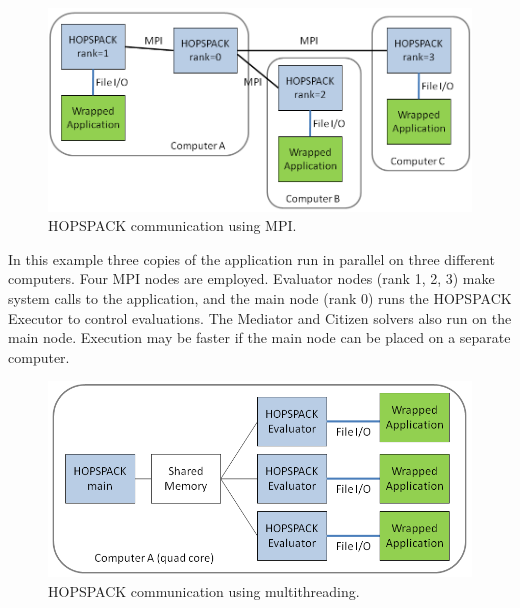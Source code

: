\clearpage
\begin{figure}[!h]
  \begin{center}
    \includegraphics[width=5.0in]{EvalWithMpiClipped.png}
  \end{center}
  \vspace{-5mm}
  \caption{HOPSPACK communication using MPI.}
  \label{fig:evalMPI}
\end{figure}

\vspace{-11pt}
\noindent
In this example three copies of the application run in parallel
on three different computers.  Four MPI nodes are employed.
Evaluator nodes (rank 1, 2, 3) make system calls to the application,
and the main node (rank 0) runs the HOPSPACK Executor to control evaluations. 
The Mediator and Citizen solvers also run on the main node.
Execution may be faster if the main node can be placed on a separate computer.


\vspace{11pt}
\vspace{11pt}
\vspace{11pt}


\begin{figure}[!h]
  \begin{center}
    \includegraphics[width=5.0in]{EvalWithMtClipped.png}
  \end{center}
  \vspace{-5mm}
  \caption{HOPSPACK communication using multithreading.}
  \label{fig:evalMT}
\end{figure}

